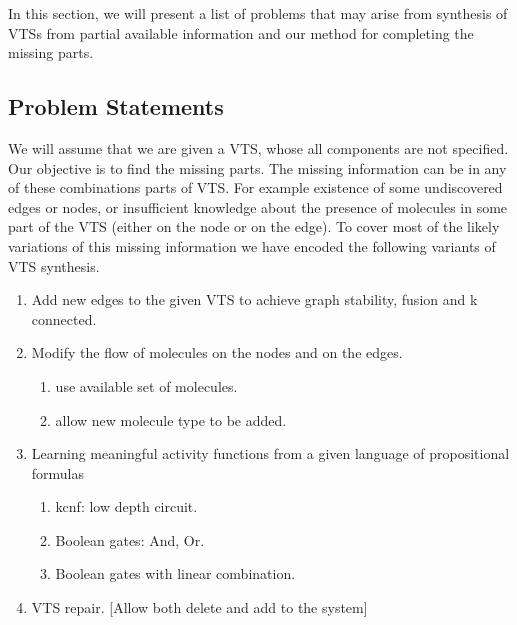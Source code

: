 In this section, we will present a list of problems that may arise from
synthesis of VTSs from partial available information
and our method for completing the missing parts.

\subsection{Problem Statements}

We will assume that we are given a VTS, whose all components
are not specified.
%
Our objective is to find the missing parts.
%
The missing information can be in any of these combinations parts of
VTS. For example existence of some undiscovered edges or nodes, or
insufficient knowledge about the presence of molecules in some part of
the VTS (either on the node or on the edge).
%
To cover most of the likely variations of this missing information we
have encoded the following variants of VTS synthesis.



%
%
\begin{enumerate}[label=\Alph*]
\item  Add new edges to the given VTS to achieve graph stability, fusion and k connected. 
\item  Modify the flow of molecules on the nodes and on the edges.
  \begin{enumerate}
  	\item use available set of molecules.
    \item allow new molecule type to be added.     
  \end{enumerate}        
\item Learning meaningful activity functions from a given language of
  propositional formulas
  \begin{enumerate}
    \item kcnf: low depth circuit.
    \item Boolean gates: And, Or.
    \item Boolean gates with linear combination.  
    \end{enumerate}        
\item  VTS repair. [Allow both delete and add to the system]
\end{enumerate}

